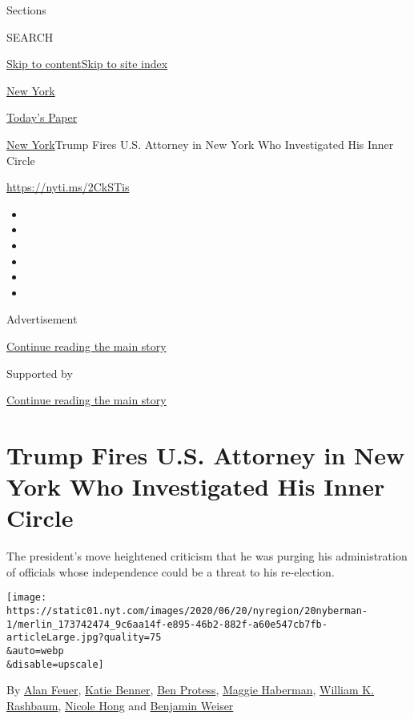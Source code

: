 Sections

SEARCH

\protect\hyperlink{site-content}{Skip to
content}\protect\hyperlink{site-index}{Skip to site index}

\href{https://www.nytimes.com/section/nyregion}{New York}

\href{https://myaccount.nytimes.com/auth/login?response_type=cookie\&client_id=vi}{}

\href{https://www.nytimes.com/section/todayspaper}{Today's Paper}

\href{/section/nyregion}{New York}\textbar{}Trump Fires U.S. Attorney in
New York Who Investigated His Inner Circle

\url{https://nyti.ms/2CkSTis}

\begin{itemize}
\item
\item
\item
\item
\item
\item
\end{itemize}

Advertisement

\protect\hyperlink{after-top}{Continue reading the main story}

Supported by

\protect\hyperlink{after-sponsor}{Continue reading the main story}

\hypertarget{trump-fires-us-attorney-in-new-york-who-investigated-his-inner-circle}{%
\section{Trump Fires U.S. Attorney in New York Who Investigated His
Inner
Circle}\label{trump-fires-us-attorney-in-new-york-who-investigated-his-inner-circle}}

The president's move heightened criticism that he was purging his
administration of officials whose independence could be a threat to his
re-election.

\texttt{[image: https://static01.nyt.com/images/2020/06/20/nyregion/20nyberman-1/merlin\_173742474\_9c6aa14f-e895-46b2-882f-a60e547cb7fb-articleLarge.jpg?quality=75\\\&auto=webp\\\&disable=upscale]}

By \href{https://www.nytimes.com/by/alan-feuer}{Alan Feuer},
\href{https://www.nytimes.com/by/katie-benner}{Katie Benner},
\href{https://www.nytimes.com/by/ben-protess}{Ben Protess},
\href{https://www.nytimes.com/by/maggie-haberman}{Maggie Haberman},
\href{https://www.nytimes.com/by/william-k-rashbaum}{William K.
Rashbaum}, \href{https://www.nytimes.com/by/nicole-hong}{Nicole Hong}
and \href{https://www.nytimes.com/by/benjamin-weiser}{Benjamin Weiser}

